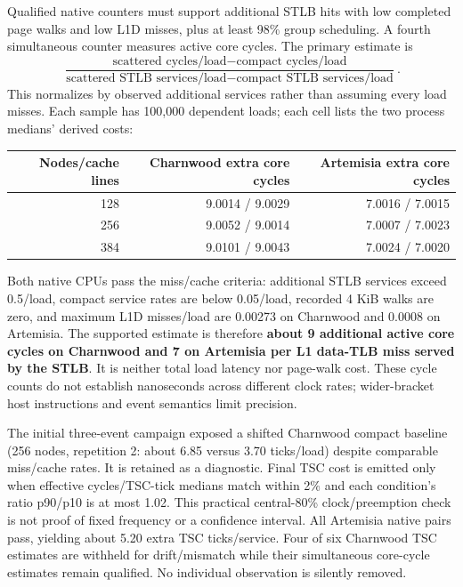 \documentclass[11pt]{article}
\begin{document}
Qualified native counters must support additional STLB hits with low completed page walks and low L1D misses, plus at least 98\% group scheduling. A fourth simultaneous counter measures active core cycles. The primary estimate is
\[
\frac{\text{scattered cycles/load}-\text{compact cycles/load}}
{\text{scattered STLB services/load}-\text{compact STLB services/load}}.
\]
This normalizes by observed additional services rather than assuming every load misses. Each sample has 100,000 dependent loads; each cell lists the two process medians' derived costs:
\begin{center}\begin{tabular}{rrr}
Nodes/cache lines & Charnwood extra core cycles & Artemisia extra core cycles\\\hline
128 & 9.0014 / 9.0029 & 7.0016 / 7.0015\\
256 & 9.0052 / 9.0014 & 7.0007 / 7.0023\\
384 & 9.0101 / 9.0043 & 7.0024 / 7.0020
\end{tabular}\end{center}
Both native CPUs pass the miss/cache criteria: additional STLB services exceed 0.5/load, compact service rates are below 0.05/load, recorded 4 KiB walks are zero, and maximum L1D misses/load are 0.00273 on Charnwood and 0.0008 on Artemisia. The supported estimate is therefore \textbf{about 9 additional active core cycles on Charnwood and 7 on Artemisia per L1 data-TLB miss served by the STLB}. It is neither total load latency nor page-walk cost. These cycle counts do not establish nanoseconds across different clock rates; wider-bracket host instructions and event semantics limit precision.

The initial three-event campaign exposed a shifted Charnwood compact baseline (256 nodes, repetition 2: about 6.85 versus 3.70 ticks/load) despite comparable miss/cache rates. It is retained as a diagnostic. Final TSC cost is emitted only when effective cycles/TSC-tick medians match within 2\% and each condition's ratio p90/p10 is at most 1.02. This practical central-80\% clock/preemption check is not proof of fixed frequency or a confidence interval. All Artemisia native pairs pass, yielding about 5.20 extra TSC ticks/service. Four of six Charnwood TSC estimates are withheld for drift/mismatch while their simultaneous core-cycle estimates remain qualified. No individual observation is silently removed.
\end{document}
